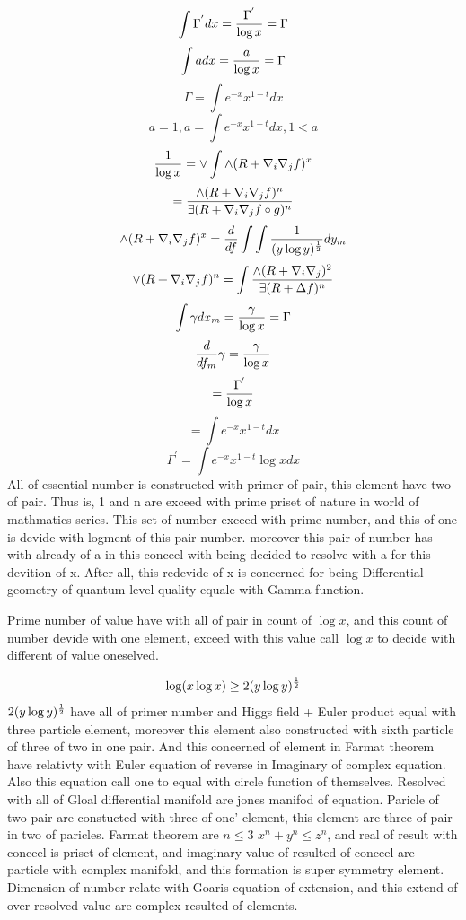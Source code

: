 \documentclass{jsarticle}
\begin{document}
   $$ \int \Gamma^{'} dx = {\Gamma^{'} \over \log x}
   = \Gamma $$
   $$ \int a dx = {a \over \log x} = \Gamma $$
   $$ \Gamma = \int e^{-x} x^{1 - t} dx $$
   $$ a = 1, a = \int e^{-x} x^{1 - t} dx , 1 < a $$
   $$ {1 \over \log x} = \vee \int \wedge (R + \nabla_{i}\nabla_{j}f)^{x} $$
   $$ = {{\wedge {(R + \nabla_{i}\nabla_{j}f)^{n}}} \over 
   {\exists(R + \nabla_{i}\nabla_{j} f \circ g)^{n} }} $$
   $$ \wedge(R + \nabla_{i}\nabla_{j}f)^{x} = {d \over df}\int \int{
	   1 \over (y \log y)^{1 \over 2}}dy_m $$
   $$ {\vee(R + \nabla_{i}\nabla_{j}f)^{n}} = \int {
	   {\wedge(R + \nabla_{i}\nabla_{j})^2 \over {\exists(R + \Delta f)^n}
	   }} $$
   $$ \int \gamma dx_m = {\gamma \over \log x} = \Gamma  $$
   $$ {d \over df_m}\gamma = {\gamma \over \log x} $$
   $$ = {\Gamma^{'} \over \log x} $$
   $$ = \int e^{-x} x^{1 - t} dx $$
   $$ \Gamma^{'} = \int e^{-x}x^{1 - t}\log x dx $$
   All of essential number is constructed with primer of pair,
   this element have two of pair. Thus is, 1 and n are exceed with prime
   priset of nature in world of mathmatics series.
   This set of number exceed with prime number, and this of one
   is devide with logment of this pair number. moreover
   this pair of number has with already of a in this conceel with being
   decided to resolve with a for this devition of x.
   After all, this redevide of x is concerned for being Differential
   geometry of quantum level quality equale with Gamma function.

   Prime number of value have with all of pair in count of $\log x $,
   and this count of number devide with one element, exceed with
   this value call $\log x$ to decide with different of value oneselved.

   $$ \log (x \log x) \ge 2(y \log y)^{1 \over 2} $$
   $ 2 (y \log y)^{1 \over 2}$ have all of primer number
   and Higgs field + Euler product equal with three particle element,
   moreover this element also constructed with sixth particle of three
   of two in one pair.
   And this concerned of element in Farmat theorem have relativty 
   with Euler equation of reverse in Imaginary of complex equation.
   Also this equation call one to equal with circle function of
   themselves.
   Resolved with all of Gloal differential manifold are jones manifod
   of equation.
   Paricle of two pair are constucted with three of one' element,
   this element are three of pair in two of paricles.
   Farmat theorem are $ n \le 3 $ $ x^n + y^n \le z^n $, and
   real of result with conceel is priset of element, and
   imaginary value of resulted of conceel are particle with
   complex manifold, and this formation is super symmetry element.
   Dimension of number relate with Goaris equation of extension,
   and this extend of over resolved value are complex resulted of
   elements.
\end{document}
